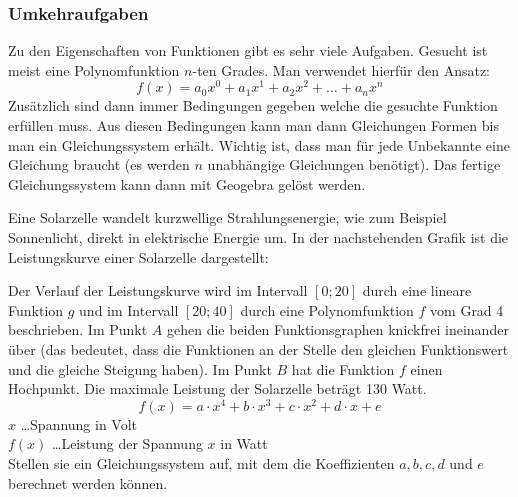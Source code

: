 \subsubsection{Umkehraufgaben}
Zu den Eigenschaften von Funktionen gibt es sehr viele Aufgaben. Gesucht ist meist eine Polynomfunktion $n$-ten Grades.
Man verwendet hierfür den Ansatz:
\[
    f(x) = a_0 x^0 + a_1 x^1 + a_2 x^2 + \dots + a_n x^n
\]
Zusätzlich sind dann immer Bedingungen gegeben welche die gesuchte Funktion erfüllen muss. Aus diesen Bedingungen kann man dann Gleichungen Formen bis man ein Gleichungssystem erhält. Wichtig ist, dass man für jede Unbekannte eine Gleichung braucht (es werden $n$ unabhängige Gleichungen benötigt).
Das fertige Gleichungssystem kann dann mit Geogebra gelöst werden.
\\[20pt]


\begin{aufgabe}
    Eine Solarzelle wandelt kurzwellige Strahlungsenergie, wie zum Beispiel Sonnenlicht, direkt in elektrische Energie um.
    In der nachstehenden Grafik ist die Leistungskurve einer Solarzelle dargestellt:
    \begin{center}
    \end{center}
    Der Verlauf der Leistungskurve wird im Intervall $[0; 20]$ durch eine lineare Funktion $g$ und
    im Intervall $[20; 40]$ durch eine Polynomfunktion $f$ vom Grad 4 beschrieben. Im Punkt $A$
    gehen die beiden Funktionsgraphen knickfrei ineinander über (das bedeutet, dass die
    Funktionen an der Stelle den gleichen Funktionswert und die gleiche Steigung haben). Im
    Punkt $B$ hat die Funktion $f$ einen Hochpunkt. Die maximale Leistung der Solarzelle beträgt
    130 Watt. 
    \[
        f(x) = a \cdot x^4 + b \cdot x^3 + c \cdot x^2 + d \cdot x + e
    \]
    $x$ \dots Spannung in Volt \\
    $f(x)$ \dots Leistung der Spannung $x$ in Watt \\[10pt]
    Stellen sie ein Gleichungssystem auf, mit dem die Koeffizienten $a,b,c,d$ und $e$ berechnet werden können.
\end{aufgabe}
